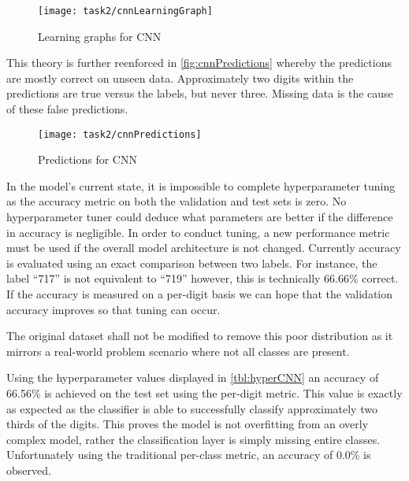 \begin{figure}[!htbp]
    \centering
    \texttt{[image: task2/cnnLearningGraph]}
    \caption[Learning graphs for CNN]
    {Learning graphs for CNN}
    \label{fig:cnnLearning}
\end{figure}

This theory is further reenforced in \autoref{fig:cnnPredictions} whereby the predictions are mostly correct on unseen data. Approximately two digits within the predictions are true versus the labels, but never three. Missing data is the cause of these false predictions.

\begin{figure}[!htbp]
    \centering
    \texttt{[image: task2/cnnPredictions]}
    \caption[Predictions for CNN]
    {Predictions for CNN}
    \label{fig:cnnPredictions}
\end{figure}

In the model's current state, it is impossible to complete hyperparameter tuning as the accuracy metric on both the validation and test sets is zero. No hyperparameter tuner could deduce what parameters are better if the difference in accuracy is negligible. In order to conduct tuning, a new performance metric must be used if the overall model architecture is not changed. Currently accuracy is evaluated using an exact comparison between two labels. For instance, the label “717” is not equivalent to “719” however, this is technically 66.66\% correct. If the accuracy is measured on a per-digit basis we can hope that the validation accuracy improves so that tuning can occur.

The original dataset shall not be modified to remove this poor distribution as it mirrors a real-world problem scenario where not all classes are present.

Using the hyperparameter values displayed in \autoref{tbl:hyperCNN} an accuracy of 66.56\% is achieved on the test set using the per-digit metric. This value is exactly as expected as the classifier is able to successfully classify approximately two thirds of the digits. This proves the model is not overfitting from an overly complex model, rather the classification layer is simply missing entire classes. Unfortunately using the traditional per-class metric, an accuracy of 0.0\% is observed.

